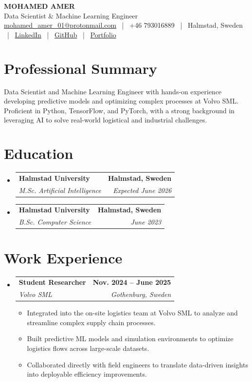 \documentclass[10pt,a4paper]{article}
\makeatletter
\newcommand{\resumeItem}[1]{
  \item\small{
    {#1 \vspace{-2pt}}
  }
}
\newcommand{\resumeSubheading}[4]{
  \vspace{3pt}\item
    \begin{tabular*}{1.0\textwidth}[t]{l@{\extracolsep{\fill}}r}
      \textbf{#1} & \textbf{#2} \\
      \textit{\small#3} & \textit{\small #4} \\
    \end{tabular*}\vspace{-3pt}
}
\newcommand{\resumeSubHeadingListStart}{\begin{itemize}[leftmargin=0.0in, label={}]}
\newcommand{\resumeSubHeadingListEnd}{\end{itemize}}
\newcommand{\resumeItemListStart}{\begin{itemize}[leftmargin=0.15in]}
\newcommand{\resumeItemListEnd}{\end{itemize}\vspace{1pt}}
\makeatother
\begin{document}
\color{text}

\begin{center}
    {\Huge \textbf{MOHAMED AMER}} \\ \vspace{2pt}
    {\large Data Scientist \& Machine Learning Engineer} \\ \vspace{2pt}
    \small
     \href{mailto:mohamed_amer_01@protonmail.com}{mohamed\_amer\_01@protonmail.com} ~|~
     +46 793016889 ~|~
     Halmstad, Sweden ~|~
     \href{https://www.linkedin.com/in/mohamed-amer-5a7a55255}{LinkedIn} ~|~
     \href{https://github.com/ham0di01}{GitHub} ~|~
     \href{https://ham0di01.github.io/}{Portfolio}
\end{center}

\vspace{3pt}

\section{Professional Summary}
\vspace{2pt}
\small{Data Scientist and Machine Learning Engineer with hands-on experience developing predictive models and optimizing complex processes at Volvo SML. Proficient in Python, TensorFlow, and PyTorch, with a strong background in leveraging AI to solve real-world logistical and industrial challenges.}
\vspace{2pt}

\section{Education}
  \resumeSubHeadingListStart
    \resumeSubheading
      {Halmstad University}{Halmstad, Sweden}
      {M.Sc. Artificial Intelligence}{Expected June 2026}
    \resumeSubheading
      {Halmstad University}{Halmstad, Sweden}
      {B.Sc. Computer Science}{June 2023}
  \resumeSubHeadingListEnd

\section{Work Experience}
  \resumeSubHeadingListStart
    \resumeSubheading
      {Student Researcher}{Nov. 2024 -- June 2025}
      {Volvo SML}{Gothenburg, Sweden}
      \resumeItemListStart
        \resumeItem{Integrated into the on-site logistics team at Volvo SML to analyze and streamline complex supply chain processes.}
        \resumeItem{Built predictive ML models and simulation environments to optimize logistics flows across large-scale datasets.}
        \resumeItem{Collaborated directly with field engineers to translate data-driven insights into deployable efficiency improvements.}
      \resumeItemListEnd
  \resumeSubHeadingListEnd
\end{document}
